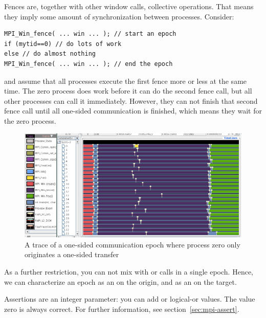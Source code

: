 Fences are, together with other window calls, collective operations. That means they 
imply some amount of synchronization between processes. Consider:
\begin{verbatim}
MPI_Win_fence( ... win ... ); // start an epoch
if (mytid==0) // do lots of work
else // do almost nothing
MPI_Win_fence( ... win ... ); // end the epoch
\end{verbatim}
and assume that all processes execute the first fence more or less at the same time.
The zero process does work before it can do the second fence call, but all other
processes can call it immediately. However, they can not finish that second fence call
until all one-sided communication is finished, which means they wait for the zero process.
\begin{figure}[ht]
  \includegraphics[scale=.4]{graphics/lonestar-twonode-put}%
  \caption{A trace of a one-sided communication epoch where process zero only originates
  a one-sided transfer}
  \label{fig:putblock}
\end{figure}

As a further restriction, you can not mix  with  or 
calls in a single epoch. Hence, we can characterize an epoch as an
 on the origin, and
as an  on the target.

Assertions are an integer parameter: you can add or logical-or values.
The value zero is always correct. For further information, see
section~\ref{sec:mpi-assert}.


